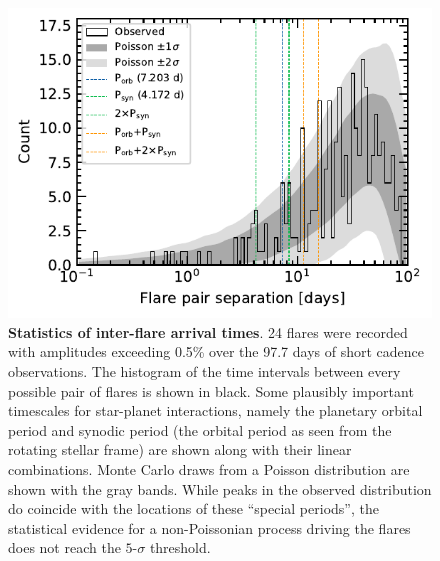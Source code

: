 \documentclass[12pt,modern,twocolumn,tighten]{aastex63}
\begin{document}
\begin{figure}[t]
	\begin{center}
		\leavevmode
		\includegraphics[width=1.0\textwidth]{f13.pdf}
	\end{center}
	\vspace{-0.7cm}
	\caption{
		{\bf Statistics of inter-flare arrival times}.  
    24 flares were recorded with amplitudes exceeding 0.5\% over the
    97.7 days of short cadence observations.  The histogram of the
    time intervals between every possible pair of flares is shown in
    black.  Some plausibly important timescales for star-planet
    interactions, namely the planetary orbital period and synodic
    period (the orbital period as seen from the rotating stellar frame) are
    shown along with their linear combinations.  Monte Carlo
    draws from a Poisson distribution are shown
    with the gray bands.  While peaks in the observed distribution do
    coincide with the locations of these ``special periods'', the
    statistical evidence for a non-Poissonian process driving the
    flares does not reach the $5$-$\sigma$ threshold.
		\label{fig:flarestats}
	}
\end{figure}
\end{document}
